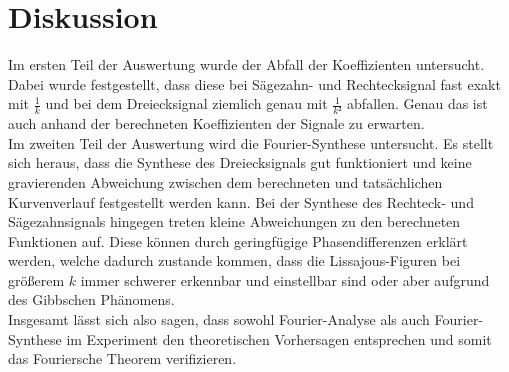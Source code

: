 \section{Diskussion}
\label{sec:Diskussion}

Im ersten Teil der Auswertung wurde der Abfall der Koeffizienten untersucht. 
Dabei wurde festgestellt, dass diese bei Sägezahn- und Rechtecksignal fast 
exakt mit $\frac{1}{k}$ und bei dem Dreiecksignal ziemlich genau mit $\frac{1}{k²}$
abfallen. Genau das ist auch anhand der berechneten Koeffizienten der Signale 
zu erwarten. 
\\
Im zweiten Teil der Auswertung wird die Fourier-Synthese untersucht. Es stellt 
sich heraus, dass die Synthese des Dreiecksignals gut funktioniert und 
keine gravierenden Abweichung zwischen dem berechneten und tatsächlichen Kurvenverlauf
festgestellt werden kann. Bei der Synthese des Rechteck- und Sägezahnsignals 
hingegen treten kleine Abweichungen zu den berechneten Funktionen auf. Diese 
können durch geringfügige Phasendifferenzen erklärt werden, welche dadurch zustande
kommen, dass die Lissajous-Figuren bei größerem $k$ immer schwerer erkennbar und 
einstellbar sind oder aber aufgrund des Gibbschen Phänomens. 
\\
Insgesamt lässt sich also sagen, dass sowohl Fourier-Analyse als auch Fourier-Synthese
im Experiment den theoretischen Vorhersagen entsprechen und somit das 
Fouriersche Theorem verifizieren. 